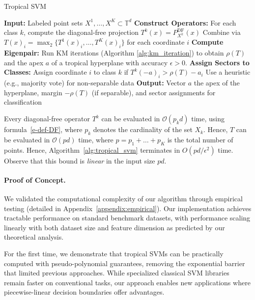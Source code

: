 \documentclass{article}
\newcommand{\trop}{\mathbb{T}}
\begin{document}
\begin{algorithm}
\caption{Tropical SVM}\label{alg:tropical_svm}
\begin{algorithmic}[1]
\STATE \textbf{Input:} Labeled point sets $X^1,\dots,X^K \subset \trop^d$
\STATE \textbf{Construct Operators:}
  \STATE \quad For each class $k$, compute the diagonal-free projection $T^k(x) = P^{\textrm{DF}}_{X^k}(x)$
  \STATE \quad Combine via $T(x)_i = \operatorname{\max}_2\{T^1(x)_i, \dots, T^K(x)_i\}$ for each coordinate $i$
\STATE \textbf{Compute Eigenpair:}
  \STATE \quad Run KM iterations (Algorithm \ref{alg:km_iteration}) to obtain $\rho(T)$ and the apex $a$ of a tropical hyperplane with accuracy $\epsilon>0$.
\STATE \textbf{Assign Sectors to Classes:}
    \STATE Assign coordinate $i$ to class $k$ if $T^k(-a)_i > \rho(T) - a_i$
  \ELSE
    \STATE Use a heuristic (e.g., majority vote) for non-separable data
  \ENDIF
\STATE \textbf{Output:} Vector $a$ the apex of the hyperplane, margin $-\rho(T)$ (if separable), and sector assignments for classification
\end{algorithmic}
\end{algorithm}
Every diagonal-free operator $T^k$ can be evaluated in $\mathcal{O}(p_k d)$ time, using formula~\eqref{e-def-DF},
where $p_k$ denotes the cardinality of the set $X_k$. Hence, $T$ can be evaluated in
$\mathcal{O}(pd)$ time, where $p=p_1+\dots+p_K$ is the total number of points.
Hence, Algorithm~\ref{alg:tropical_svm} terminates in $O(pd/\epsilon^2)$ time. Observe
that this bound is {\em linear} in the input size $pd$. 

\paragraph{Proof of Concept.}
We validated the computational complexity of our algorithm through empirical testing (detailed in Appendix~\ref{appendix:empirical}). Our implementation achieves tractable performance on standard benchmark datasets, with performance scaling linearly with both dataset size and feature dimension as predicted by our theoretical analysis.

For the first time, we demonstrate that tropical SVMs can be practically computed with pseudo-polynomial guarantees, removing the exponential barrier that limited previous approaches. While specialized classical SVM libraries remain faster on conventional tasks, our approach enables new applications where piecewise-linear decision boundaries offer advantages.
\end{document}
